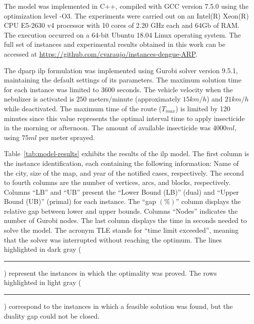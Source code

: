 \documentclass[a4paper,11pt]{article}
\newcommand\crule[3][black]{\textcolor{#1}{\rule{#2}{#3}}}
\begin{document}
The model  was implemented  in C++,  compiled with GCC  version 7.5.0  using the
optimization level -O3. The experiments were  carried out on an Intel(R) Xeon(R)
CPU E5-2630  v4 processor with 10  cores of 2.20 GHz  each and 64Gb of  RAM. The
execution occurred on a 64-bit Ubuntu 18.04 Linux operating system. The full set
of instances and  experimental results obtained in this work  can be accessed at
\href{https://github.com/cvaraujo/instances-dengue-ARP}{https://github.com/cvaraujo/instances-dengue-ARP}.

The  \gls{dparp}  \gls{ilp}  formulation  was implemented  using  Gurobi  solver
version 9.5.1, maintaining  the default settings of its  parameters. The maximum
solution  time for  each  instance  was limited  to  3600  seconds. The  vehicle
velocity when the nebulizer is activated is $250$ meters$/$minute (approximately
$15km/h$)  and  $21km/h$  while  deactivated.  The maximum  time  of  the  route
($T_{max}$) is  limited by 120 minutes  since this value represents  the optimal
interval time  to apply insecticide in  the morning or afternoon.  The amount of
available insecticide was 4000$ml$, using $75ml$ per meter sprayed.

Table~\ref{tab:model-results} exhibits  the results of the  \gls{ilp} model. The
first  column is  the  instance identification,  each  containing the  following
information: Name of the city, size of  the map, and year of the notified cases,
respectively. The second to fourth columns are the number of vertices, arcs, and
blocks, respectively. Columns ``LB'' and ``UB'' present the ``Lower Bound (LB)''
(dual) and ``Upper  Bound (UB)'' (primal) for each instance.  The ``gap $(\%)$''
column  displays  the relative  gap  between  lower  and upper  bounds.  Columns
``Nodes'' indicates  the number of  Gurobi nodes.  The last column  displays the
time in  seconds needed to  solve the model. The  acronym TLE stands  for ``time
limit exceeded'', meaning  that the solver was interrupted  without reaching the
optimum. The lines highlighted in dark gray (\crule[gr]{3mm}{3mm}) represent the
instances in which the optimality was proved. The rows highlighted in light gray
(\crule[lgr]{3mm}{3mm}) correspond to the instances in which a feasible solution
was found, but the duality gap could not be closed.
\end{document}
